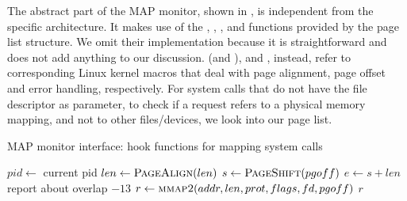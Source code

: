 The abstract part of the MAP monitor, shown in , is independent from the specific architecture.
It makes use of the , , ,  and 
functions provided by the page list structure. We omit their implementation because it is straightforward and does not add anything to our discussion.
 (and ),  and , instead, refer to corresponding Linux kernel macros that deal with
page alignment, page offset and error handling, respectively.
For system calls that do not have the file descriptor as parameter, to check if a request refers to a physical memory mapping, and not to other files/devices,
we look into our page list.
\begin{algorithm}[h]
\caption{MAP monitor interface: hook functions for mapping system calls}
\label{alg:map-iface}
\begin{algorithmic}[1]
 
	\State $pid \gets$ current pid
	\State $len \gets \Call{PageAlign}{len}$ 
	 
		\State $s \gets \Call{PageShift}{pgoff}$ 
		\State $e \gets s + len$ 
		 
			\State report about overlap
				\State \Return $-13$ 
			\EndIf
		\EndIf
		\State $r \gets \Call{mmap2}{addr, len, prot, flags, fd, pgoff}$ 
		 
			\State {} 
		\EndIf
		\State \Return $r$
	\EndIf
	\State \Return {} 
\EndFunction
\Statex
\end{algorithmic}


\end{algorithm}
